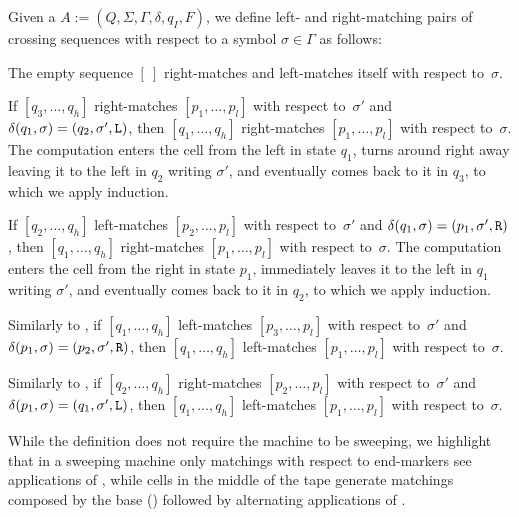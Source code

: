 \begin{defn}
	Given a \kDLA $A:=(Q,\Sigma,\Gamma,\delta,q_I,F)$, we define left- and right-matching pairs of crossing sequences with respect to a symbol $\sigma\in\Gamma$ as follows:
	\begin{rules}
		\item \label{itm:crossmatchswepDLA-1} The empty sequence $[~]$ right-matches and left-matches itself with respect to~$\sigma$.
		\item \label{itm:crossmatchswepDLA-2} If $[q_3,\dots,q_h]$ right-matches $[p_1,\dots,p_l]$ with respect to~$\sigma'$ and $\delta(q_1,\sigma)=(q_2,\sigma',\mathtt L)$, then $[q_1,\dots,q_h]$ right-matches $[p_1,\dots,p_l]$ with respect to~$\sigma$.
		The computation enters the cell from the left in state $q_1$, turns around right away leaving it to the left in $q_2$ writing $\sigma'$, and eventually comes back to it in $q_3$, to which we apply induction.
		\item \label{itm:crossmatchswepDLA-3} If $[q_2,\dots,q_h]$ left-matches $[p_2,\dots,p_l]$ with respect to~$\sigma'$ and $\delta(q_1,\sigma)=(p_1,\sigma',\mathtt R)$, then $[q_1,\dots,q_h]$ right-matches $[p_1,\dots,p_l]$ with respect to~$\sigma$.
		The computation enters the cell from the right in state $p_1$, immediately leaves it to the left in $q_1$ writing $\sigma'$, and eventually comes back to it in $q_2$, to which we apply induction.
		\item \label{itm:crossmatchswepDLA-4} Similarly to , if $[q_1,\dots,q_h]$ left-matches $[p_3,\dots,p_l]$ with respect to~$\sigma'$ and $\delta(p_1,\sigma)=(p_2,\sigma',\mathtt R)$, then $[q_1,\dots,q_h]$ left-matches $[p_1,\dots,p_l]$ with respect to~$\sigma$.
		\item \label{itm:crossmatchswepDLA-5} Similarly to , if $[q_2,\dots,q_h]$ right-matches $[p_2,\dots,p_l]$ with respect to~$\sigma'$ and $\delta(p_1,\sigma)=(q_1,\sigma',\mathtt L)$, then $[q_1,\dots,q_h]$ left-matches $[p_1,\dots,p_l]$ with respect to~$\sigma$.
	\end{rules}
\end{defn}

While the definition does not require the machine to be sweeping, we highlight that in a sweeping machine only matchings with respect to end-markers see applications of , while cells in the middle of the tape generate matchings composed by the base () followed by alternating applications of .

